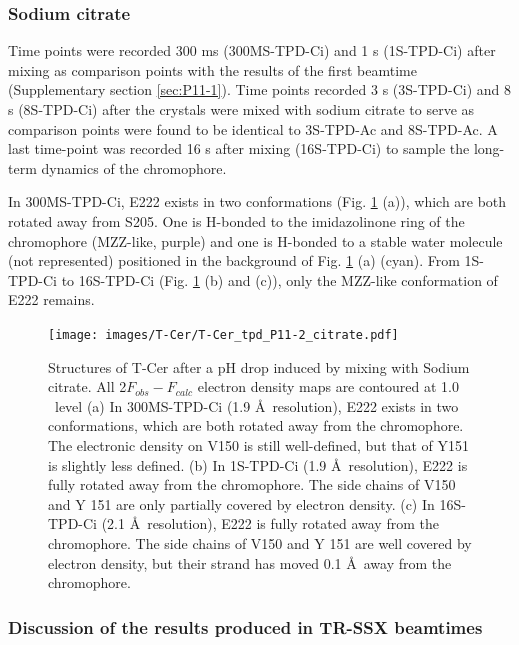 \subsubsection{Sodium citrate}\label{sec:citrate}
Time points were recorded 300 ms (300MS-TPD-Ci) and 1 s (1S-TPD-Ci) after mixing  as comparison points with the results of the first beamtime (Supplementary section \ref{sec:P11-1}).  Time points recorded 3 s (3S-TPD-Ci) and 8 s (8S-TPD-Ci) after the crystals were mixed with sodium citrate to serve as comparison points were found to be identical to 3S-TPD-Ac and 8S-TPD-Ac. A last time-point was recorded 16 s after mixing (16S-TPD-Ci) to sample the long-term dynamics of the chromophore. 

In 300MS-TPD-Ci, E222 exists in two conformations (Fig. \ref{fig:T-Cer_P11-2_Ci_results} (a)), which are both rotated away from S205. One is H-bonded to the imidazolinone ring  of the chromophore (MZZ-like, purple) and one is H-bonded to a stable water molecule (not represented) positioned in the background of Fig. \ref{fig:T-Cer_P11-2_Ci_results} (a) (cyan). From 1S-TPD-Ci to 16S-TPD-Ci (Fig. \ref{fig:T-Cer_P11-2_Ci_results} (b) and (c)), only the MZZ-like conformation of E222 remains. 
\begin{figure}[H] %
    \centering
        \noindent \texttt{[image: images/T-Cer/T-Cer\_tpd\_P11-2\_citrate.pdf]}
    \hfill
    \caption{Structures of T-Cer after a pH drop induced by mixing with Sodium citrate. All 2\(F_{obs} - F_{calc}\) electron density maps are contoured at 1.0 \textsigma\ level (a) In 300MS-TPD-Ci (1.9 \AA\ resolution), E222 exists in two conformations, which are both rotated away from the chromophore. The electronic density on V150 is still well-defined, but that of Y151 is slightly less defined.  (b) In 1S-TPD-Ci (1.9 \AA\ resolution), E222 is fully rotated away from the chromophore. The side chains of V150 and Y 151 are only partially covered by electron density. (c)  In 16S-TPD-Ci (2.1 \AA\ resolution), E222 is fully rotated away from the chromophore. The side chains of V150 and Y 151 are well covered by electron density, but their strand has moved 0.1 \AA\ away from the chromophore.}\label{fig:T-Cer_P11-2_Ci_results}
\end{figure}

\subsubsection{Discussion of the results produced in TR-SSX beamtimes}\label{sec:discussion_P11_2}

